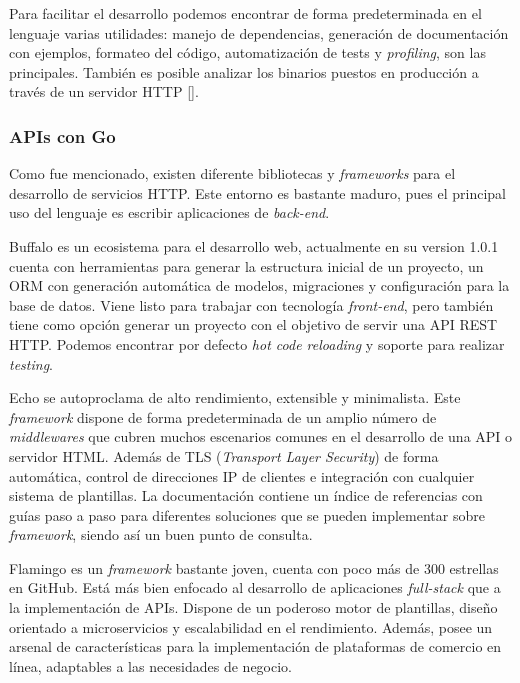 Para facilitar el desarrollo podemos encontrar de forma predeterminada en el lenguaje varias utilidades: manejo de dependencias, generación de documentación con ejemplos, formateo del código, automatización de tests y \textit{profiling}, son las principales. También es posible analizar los binarios puestos en producción a través de un servidor HTTP [\cite{go-pros-cons}].

\subsubsection{APIs con Go}

Como fue mencionado, existen diferente bibliotecas y \textit{frameworks} para el desarrollo de servicios HTTP. Este entorno es bastante maduro, pues el principal uso del lenguaje es escribir aplicaciones de \textit{back-end}.

Buffalo es un ecosistema para el desarrollo web, actualmente en su version 1.0.1 cuenta con herramientas para generar la estructura inicial de un proyecto, un ORM con generación automática de modelos, migraciones y configuración para la base de datos. Viene listo para trabajar con tecnología \textit{front-end}, pero también tiene como opción generar un proyecto con el objetivo de servir una API REST HTTP. Podemos encontrar por defecto \textit{hot code reloading} y soporte para realizar \textit{testing}.
              
Echo se autoproclama de alto rendimiento, extensible y minimalista. Este \textit{framework} dispone de forma predeterminada de un amplio número de \textit{middlewares} que cubren muchos escenarios comunes en el desarrollo de una API o servidor HTML. Además de TLS (\textit{Transport Layer Security}) de forma automática, control de direcciones IP de clientes e integración con cualquier sistema de plantillas. La documentación contiene un índice de referencias con guías paso a paso para diferentes soluciones que se pueden implementar sobre \textit{framework}, siendo así un buen punto de consulta.

Flamingo es un \textit{framework} bastante joven, cuenta con poco más de 300 estrellas en GitHub. Está más bien enfocado al desarrollo de aplicaciones \textit{full-stack} que a la implementación de APIs. Dispone de un poderoso motor de plantillas, diseño orientado a microservicios y escalabilidad en el rendimiento. Además, posee un arsenal de características para la implementación de plataformas de comercio en línea, adaptables a las necesidades de negocio.

